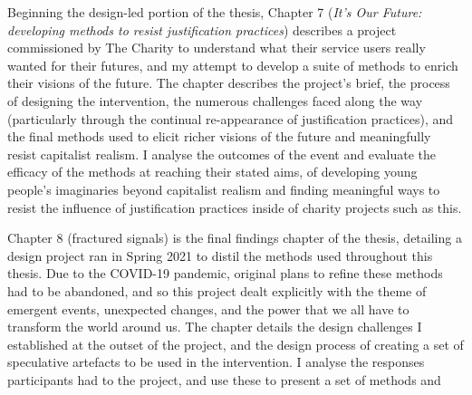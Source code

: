 Beginning the design-led portion of the thesis, Chapter 7 (\textit{It's Our Future: developing methods to resist justification practices}) describes a project commissioned by The Charity to understand what their service users really wanted for their futures, and my attempt to develop a suite of methods to enrich their visions of the future. The chapter describes the project's brief, the process of designing the intervention, the numerous challenges faced along the way (particularly through the continual re-appearance of justification practices), and the final methods used to elicit richer visions of the future and meaningfully resist capitalist realism. I analyse the outcomes of the event and evaluate the efficacy of the methods at reaching their stated aims, of developing young people's imaginaries beyond capitalist realism and finding meaningful ways to resist the influence of justification practices inside of charity projects such as this. 

Chapter 8 (fractured signals) is the final findings chapter of the thesis, detailing a design project ran in Spring 2021 to distil the methods used throughout this thesis. Due to the COVID-19 pandemic, original plans to refine these methods had to be abandoned, and so this project dealt explicitly with the theme of emergent events, unexpected changes, and the power that we all have to transform the world around us. The chapter details the design challenges I established at the outset of the project, and the design process of creating a set of speculative artefacts to be used in the intervention. I analyse the responses participants had to the project, and use these to present a set of methods and 


